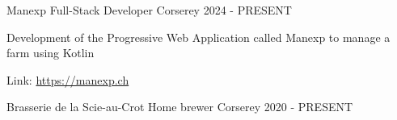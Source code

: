 

\begin{cventries}

    \cventry
    {Manexp} %
    {Full-Stack Developer} %
    {Corserey} %
    {2024 - PRESENT} %
    {
      \begin{cvitems} %
        \item {Development of the Progressive Web Application called Manexp to manage a farm using Kotlin}
        \item {Link: \href{https://manexp.ch}{https://manexp.ch}}
      \end{cvitems}
    }

    \cventry
    {Brasserie de la Scie-au-Crot} %
    {Home brewer} %
    {Corserey} %
    {2020 - PRESENT} %
    {}

\end{cventries}
